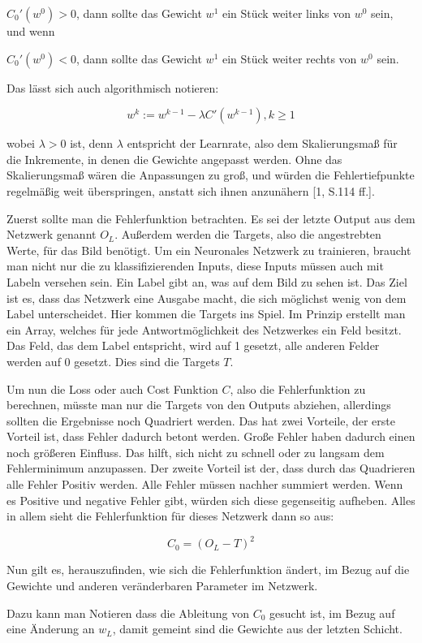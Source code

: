 \documentclass[12pt]{article}
\begin{document}
$C_0'(w^0)>0$, dann sollte das Gewicht $w^1$ ein Stück weiter links von $w^0$ sein, und wenn

$C_0'(w^0)<0$, dann sollte das Gewicht $w^1$ ein Stück weiter rechts von $w^0$ sein.

Das lässt sich auch algorithmisch notieren:

$$w^k:=w^{k-1}-\lambda C'(w^{k-1}), k \geq 1$$

wobei $\lambda > 0$ ist, denn $\lambda$ entspricht der Learnrate, also dem Skalierungsmaß für die Inkremente, in denen die Gewichte angepasst werden. Ohne das Skalierungsmaß wären die Anpassungen zu groß, und würden die Fehlertiefpunkte regelmäßig weit überspringen, anstatt sich ihnen anzunähern [1, S.114 ff.]. 

Zuerst sollte man die Fehlerfunktion betrachten. 
Es sei der letzte Output aus dem Netzwerk genannt $O_L$. Außerdem werden die Targets, also die angestrebten Werte, für das Bild benötigt. Um ein Neuronales Netzwerk zu trainieren, braucht man nicht nur die zu klassifizierenden Inputs, diese Inputs müssen auch mit Labeln versehen sein. Ein Label gibt an, was auf dem Bild zu sehen ist. Das Ziel ist es, dass das Netzwerk eine Ausgabe macht, die sich möglichst wenig von dem Label unterscheidet. Hier kommen die Targets ins Spiel. Im Prinzip erstellt man ein Array, welches für jede Antwortmöglichkeit des Netzwerkes ein Feld besitzt. Das Feld, das dem Label entspricht, wird auf 1 gesetzt, alle anderen Felder werden auf 0 gesetzt. Dies sind die Targets $T$.

Um nun die Loss oder auch Cost Funktion $C$, also die Fehlerfunktion zu berechnen, müsste man nur die Targets von den Outputs abziehen, allerdings sollten die Ergebnisse noch Quadriert werden. Das hat zwei Vorteile, der erste Vorteil ist, dass Fehler dadurch betont werden. Große Fehler haben dadurch einen noch größeren Einfluss. Das hilft, sich nicht zu schnell oder zu langsam dem Fehlerminimum anzupassen. Der zweite Vorteil ist der, dass durch das Quadrieren alle Fehler Positiv werden. Alle Fehler müssen nachher summiert werden. Wenn es Positive und negative Fehler gibt, würden sich diese gegenseitig aufheben. 
Alles in allem sieht die Fehlerfunktion für dieses Netzwerk dann so aus:

$$C_0 = (O_L - T)^2$$

Nun gilt es, herauszufinden, wie sich die Fehlerfunktion ändert, im Bezug auf die Gewichte und anderen veränderbaren Parameter im Netzwerk.

Dazu kann man Notieren dass die Ableitung von $C_0$ gesucht ist, im Bezug auf eine Änderung an $w_L$, damit gemeint sind die Gewichte aus der letzten Schicht.
\end{document}
